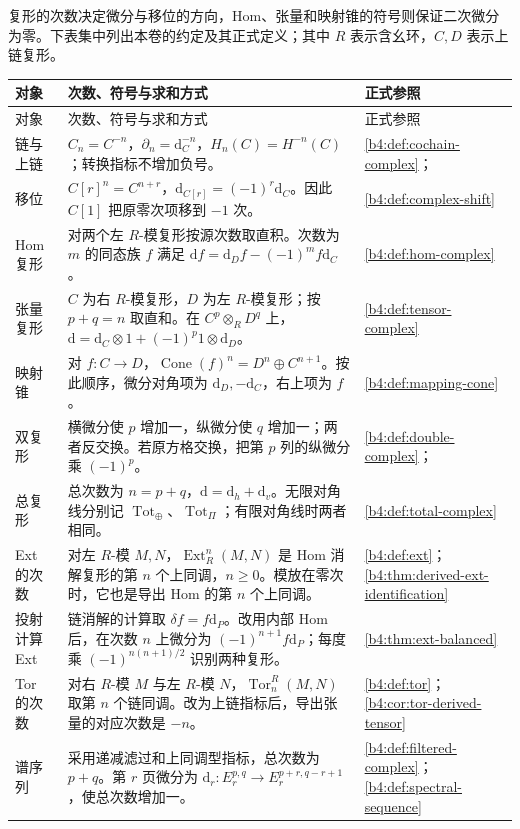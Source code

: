 复形的次数决定微分与移位的方向，Hom、张量和映射锥的符号则保证二次微分为零。下表集中列出本卷的约定及其正式定义；其中 \(R\) 表示含幺环，\(C,D\) 表示上链复形。

\begingroup
	\small
	\begin{longtable}{@{}p{}p{}p{}@{}}
		\toprule
		对象 & 次数、符号与求和方式 & 正式参照 \\
		\midrule
		\endfirsthead
		\toprule
		对象 & 次数、符号与求和方式 & 正式参照 \\
		\midrule
		\endhead
		\bottomrule
		\endfoot
		链与上链 & \(C_n=C^{-n}\)，\(\partial_n=\mathrm d_C^{-n}\)，\(H_n(C)=H^{-n}(C)\)；转换指标不增加负号。 & \cref{b4:def:cochain-complex}；\subsecref{b4:subsec:0501:03} \\
		移位 & \(C[r]^n=C^{n+r}\)，\(\mathrm d_{C[r]}=(-1)^r\mathrm d_C\)。因此 \(C[1]\) 把原零次项移到 \(-1\) 次。 & \cref{b4:def:complex-shift} \\
		Hom 复形 & 对两个左 \(R\)-模复形按源次数取直积。次数为 \(m\) 的同态族 \(f\) 满足 \(\mathrm df=\mathrm d_Df-(-1)^mf\mathrm d_C\)。 & \cref{b4:def:hom-complex} \\
		张量复形 & \(C\) 为右 \(R\)-模复形，\(D\) 为左 \(R\)-模复形；按 \(p+q=n\) 取直和。在 \(C^p\otimes_R D^q\) 上，\(\mathrm d=\mathrm d_C\otimes1+(-1)^p1\otimes\mathrm d_D\)。 & \cref{b4:def:tensor-complex} \\
		映射锥 & 对 \(f:C\to D\)，\(\operatorname{Cone}(f)^n=D^n\oplus C^{n+1}\)。按此顺序，微分对角项为 \(\mathrm d_D,-\mathrm d_C\)，右上项为 \(f\)。 & \cref{b4:def:mapping-cone} \\
		双复形 & 横微分使 \(p\) 增加一，纵微分使 \(q\) 增加一；两者反交换。若原方格交换，把第 \(p\) 列的纵微分乘 \((-1)^p\)。 & \cref{b4:def:double-complex}；\subsecref{b4:subsec:0604:01} \\
		总复形 & 总次数为 \(n=p+q\)，\(\mathrm d=\mathrm d_h+\mathrm d_v\)。无限对角线分别记 \(\operatorname{Tot}_{\oplus}\)、\(\operatorname{Tot}_{\Pi}\)；有限对角线时两者相同。 & \cref{b4:def:total-complex} \\
		Ext 的次数 & 对左 \(R\)-模 \(M,N\)，\(\operatorname{Ext}_R^n(M,N)\) 是 Hom 消解复形的第 \(n\) 个上同调，\(n\ge0\)。模放在零次时，它也是导出 Hom 的第 \(n\) 个上同调。 & \cref{b4:def:ext}；\cref{b4:thm:derived-ext-identification} \\
		投射计算 Ext & 链消解的计算取 \(\delta f=f\mathrm d_P\)。改用内部 Hom 后，在次数 \(n\) 上微分为 \((-1)^{n+1}f\mathrm d_P\)；每度乘 \((-1)^{n(n+1)/2}\) 识别两种复形。 & \cref{b4:thm:ext-balanced} \\
		Tor 的次数 & 对右 \(R\)-模 \(M\) 与左 \(R\)-模 \(N\)，\(\operatorname{Tor}_n^R(M,N)\) 取第 \(n\) 个链同调。改为上链指标后，导出张量的对应次数是 \(-n\)。 & \cref{b4:def:tor}；\cref{b4:cor:tor-derived-tensor} \\
		谱序列 & 采用递减滤过和上同调型指标，总次数为 \(p+q\)。第 \(r\) 页微分为 \(\mathrm d_r:E_r^{p,q}\to E_r^{p+r,q-r+1}\)，使总次数增加一。 & \cref{b4:def:filtered-complex}；\cref{b4:def:spectral-sequence} \\
	\end{longtable}
\endgroup

